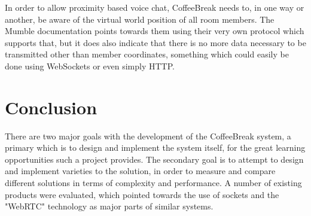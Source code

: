 In order to allow proximity based voice chat, CoffeeBreak needs to, in one way or another, be aware of the virtual world position of all room members. The Mumble documentation points towards them using their very own protocol which supports that, but it does also indicate that there is no more data necessary to be transmitted other than member coordinates, something which could easily be done using WebSockets or even simply HTTP.

\section{Conclusion}

There are two major goals with the development of the CoffeeBreak system, a primary which is to design and implement the system itself, for the great learning opportunities such a project provides. The secondary goal is to attempt to design and implement varieties to the solution, in order to measure and compare different solutions in terms of complexity and performance. A number of existing products were evaluated, which pointed towards the use of sockets and the "WebRTC" technology as major parts of similar systems.